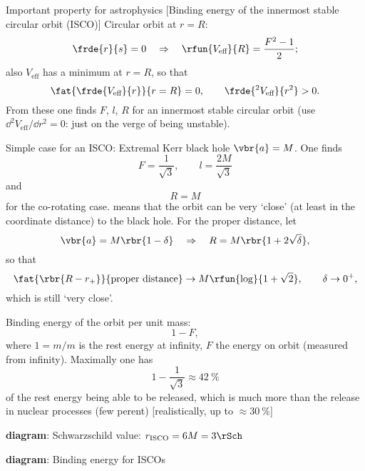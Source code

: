 \begin{nameddef}{Important property for astrophysics}%
[Binding energy of the innermost stable circular orbit (ISCO)]
Circular orbit at $r = R$:
\begin{equation}
\frde{r}{s} = 0 \quad \Rightarrow \quad
\rfun{V_\text{eff}}{R} = \frac{F^2-1}{2};
\end{equation}
also $V_\text{eff}$ has a minimum at $r = R$, so that
\begin{equation}
\fat{\frde{V_\text{eff}}{r}}{r=R} = 0,\qquad
\frde{^2 V_\text{eff}}{r^2} > 0.
\end{equation}
From these one finds $F$, $l$, $R$ for an innermost stable circular orbit
(use $\dd^2 V_\text{eff}/\dd r^2 = 0$: just on the verge of being unstable).

Simple case for an ISCO: Extremal Kerr black hole $\vbr{a} = M$. One finds
\begin{equation}
F = \frac{1}{\sqrt{3}},\qquad l = \frac{2M}{\sqrt{3}}
\end{equation}
and
\begin{equation}
R = M
\label{eq:ISCOr=M}
\end{equation}
for the co-rotating case.  means that the orbit can be very
`close' (at least in the coordinate distance) to the black hole. For the
proper distance, let
\begin{equation}
\vbr{a} = M\rbr{1-\delta}\quad\Rightarrow\quad R = M\rbr{1+2\sqrt{\delta}},
\end{equation}
so that
\begin{equation}
\fat{\rbr{R-r_+}}{\text{proper distance}} \to M\rfun{\log}{1+\sqrt{2}},
\qquad\delta\to 0^+,
\end{equation}
which is still `very close'.

Binding energy of the orbit per unit mass:
\begin{equation}
1-F,
\end{equation}
where $1 = m/m$ is the rest energy at infinity, $F$ the energy on orbit
(measured from infinity). Maximally one has
\begin{equation}
1 - \frac{1}{\sqrt{3}} \approx \SI{42}{\percent}
\end{equation}
of the rest energy being able to be released, which is much more than the
release in nuclear processes (few perent) [realistically, up to $\approx
\SI{30}{\percent}$]

\textbf{diagram}: Schwarzschild value: $r_\text{ISCO} = 6M = 3\rSch$

\textbf{diagram}: Binding energy for ISCOs
\end{nameddef} %


